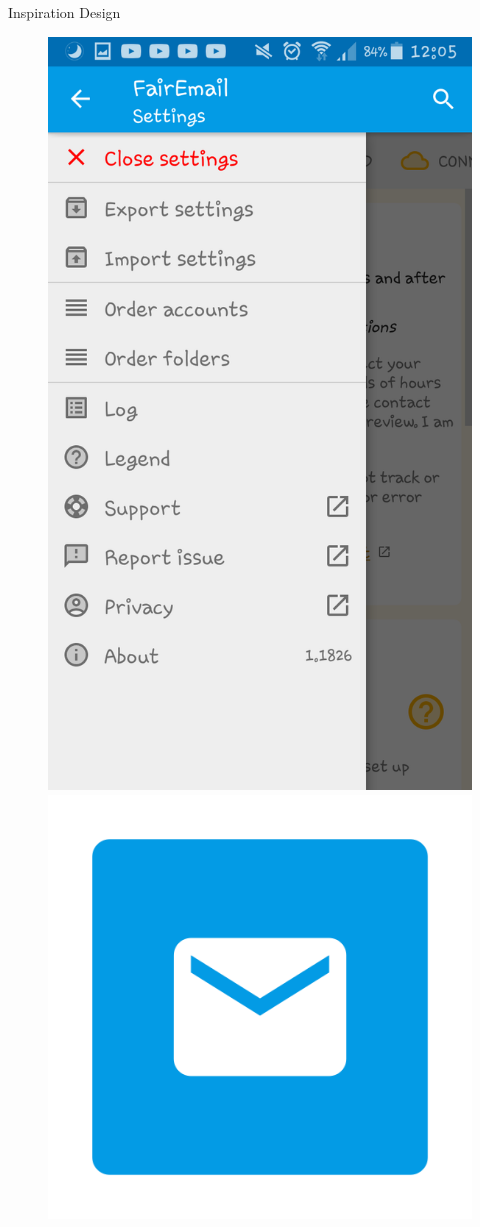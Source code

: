 \documentclass[aspectratio=169]{beamer}
\begin{document}
\begin{frame}[plain]{Inspiration Design}
\begin{varwidth}{.3\textwidth}
\begin{figure}
        \end{figure}
    \end{varwidth}
    \hfill
    \begin{varwidth}{.3\textwidth}\pause
        \begin{figure}
        \centering
        \includegraphics[width=.8\textwidth]{media/fairmail-screenshot.png}\\
        \vspace{.5cm}
        \includegraphics[width=.25\textwidth]{media/fairmail-logo.png}
        \end{figure}
\end{varwidth}
\end{frame}
\end{document}
